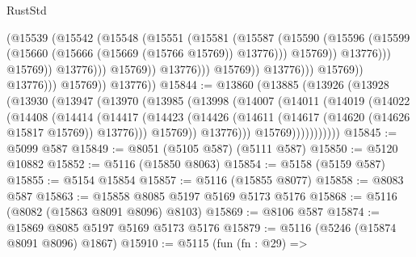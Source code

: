 \begin{lexlean}{RustStd}
\begin{coremodule}
                                              (@15539
                                                (@15542
                                                  (@15548
                                                    (@15551
                                                      (@15581
                                                        (@15587
                                                          (@15590
                                                            (@15596
                                                              (@15599
                                                                (@15660
                                                                  (@15666
                                                                    (@15669 (@15766 @15769))
                                                                    @13776)))
                                                              @15769))
                                                          @13776)))
                                                    @15769))
                                                @13776)))
                                          @15769))
                                      @13776)))
                                @15769))
                            @13776)))
                      @15769))
                  @13776)))
            @15769))
        @13776))
@15844 := @13860
    (@13885
      (@13926
        (@13928
          (@13930
            (@13947
              (@13970
                (@13985
                  (@13998
                    (@14007
                      (@14011
                        (@14019
                          (@14022
                            (@14408
                              (@14414
                                (@14417
                                  (@14423
                                    (@14426
                                      (@14611 (@14617 (@14620 (@14626 @15817 @15769)) @13776)))
                                    @15769))
                                @13776)))
                          @15769)))))))))))
@15845 := @5099 @587
@15849 := @8051 (@5105 @587) (@5111 @587)
@15850 := @5120 @10882
@15852 := @5116 (@15850 @8063)
@15854 := @5158 (@5159 @587)
@15855 := @5154 @15854
@15857 := @5116 (@15855 @8077)
@15858 := @8083 @587
@15863 := @15858 @8085 @5197 @5169 @5173 @5176
@15868 := @5116 (@8082 (@15863 @8091 @8096) @8103)
@15869 := @8106 @587
@15874 := @15869 @8085 @5197 @5169 @5173 @5176
@15879 := @5116 (@5246 (@15874 @8091 @8096) @1867)
@15910 := @5115
    (fun (fn : @29) =>

\end{coremodule}
\end{lexlean}

